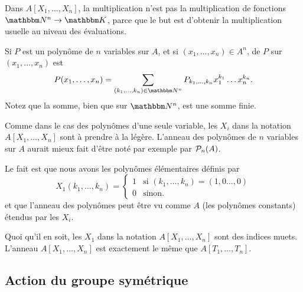 \begin{normaltext}
    Dans \( A[X_1,\ldots, X_n]\), la multiplication n'est pas la multiplication de fonctions \( \eN^n\to \eK\), parce que le but est d'obtenir la multiplication usuelle au niveau des évaluations.
\end{normaltext}

\begin{definition}
    Si \( P\) est un polynôme de \( n\) variables sur \( A\), et si \( (x_1,\ldots, x_n)\in A^n\),  de \( P\) sur \( (x_1,\ldots, x_n)\) est
    \begin{equation}
        P(x_1,\ldots, x_n)=\sum_{(k_1,\ldots, k_n)\in \eN^n}P_{k_1,\ldots, k_n}x_1^{k_1}\ldots x_n^{k_n}.
    \end{equation}
    Notez que la somme, bien que sur \( \eN^n\), est une somme finie.
\end{definition}

\begin{normaltext}
    Comme dans le cas des polynômes d'une seule variable, les \( X_i\) dans la notation \( A[X_1,\ldots, X_n]\) sont à prendre à la légère. L'anneau des polynômes de \( n\) variables sur \( A\) aurait mieux fait d'être noté par exemple par \( \mathcal{P}_n(A)\).

    Le fait est que nous avons les polynômes élémentaires définis par
    \begin{equation}
        X_1(k_1,\ldots, k_n)=\begin{cases}
            1    &   \text{si } (k_1,\ldots, k_n)=(1,0\ldots, 0)\\
            0    &    \text{sinon. }
        \end{cases}
    \end{equation}
    et que l'anneau des polynômes peut être vu comme \( A\) (les polynômes constants) étendus par les \( X_i\).

    Quoi qu'il en soit, les \( X_1\) dans la notation \( A[X_1,\ldots, X_n]\) sont des indices muets. L'anneau \( A[X_1,\ldots, X_n]\) est exactement le même que \( A[T_1,\ldots, T_n]\).
\end{normaltext}

\subsection{Action du groupe symétrique}

